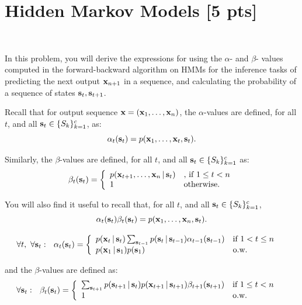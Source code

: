 \documentclass[submit]{harvardml}
\begin{document}
\newpage
\section*{Hidden Markov Models [5 pts]}
\begin{problem}
  ~

  In this problem, you will derive the expressions for using the
  $\alpha$- and $\beta$- values computed in the forward-backward
  algorithm on HMMs for the inference tasks of predicting the next
  output $\mathbf{x}_{n+1}$ in a sequence, and calculating the probability
  of a sequence of states $\mathbf{s}_t,\mathbf{s}_{t+1}$.

Recall that for output sequence $\mathbf{x}=(\mathbf{x}_1,\ldots,\mathbf{x}_n)$,
the $\alpha$-values are defined, for all $t$, and all
$\mathbf{s}_t\in \{S_k\}_{k=1}^c$, as:
%
$$
\alpha_t(\mathbf{s}_t)=p(\mathbf{x}_1,\ldots,\mathbf{x}_t,\mathbf{s}_t).
$$

Similarly, the $\beta$-values are defined, for all $t$, and all
$\mathbf{s}_t\in \{S_k\}_{k=1}^c$ as:
%
\begin{align*}
\beta_t(\mathbf{s}_t) = \left\{
\begin{array}{ll}
p(\mathbf{x}_{t+1},\ldots, \mathbf{x}_n\,|\, \mathbf{s}_t)
&\mbox{, if $1\leq t<n$}\\
1 & \mbox{otherwise.}
\end{array}
\right.
\end{align*}

You will also find it useful to recall that, 
for all $t$, and all $\mathbf{s}_t\in \{S_k\}_{k=1}^c$,
%
$$
\alpha_t(\mathbf{s}_t)\beta_t(\mathbf{s}_t)=p(\mathbf{x}_1,\ldots,\mathbf{x}_n,\mathbf{s}_t).
$$


\begin{align*}
\forall t,\ \forall \bolds_t:\ \ 
\alpha_t(\bolds_t)&=\left\{
\begin{array}{ll}
p(\boldx_t\given \bolds_t)\sum_{\bolds_{t-1}} p(\bolds_t\given\bolds_{t-1})\alpha_{t-1}(\bolds_{t-1}) &\mbox{if $1<t\leq n$}\\
p(\boldx_1\given \bolds_1)p(\bolds_1) &\mbox{o.w.}
\end{array}
\right.
\end{align*}

and the $\beta$-values are defined as:
\begin{align*}
\forall \bolds_t:\ \ 
\beta_t(\bolds_t)&=\left\{
\begin{array}{ll}
\sum_{\bolds_{t+1}} p(\bolds_{t+1}\given\bolds_{t})
p(\boldx_{t+1}\given\bolds_{t+1})\beta_{t+1}(\bolds_{t+1})
&\mbox{if $1\leq t< n$}\\
1 &\mbox{o.w.}
\end{array}
\right.
\end{align*}
\fi


\end{problem}
\end{document}
